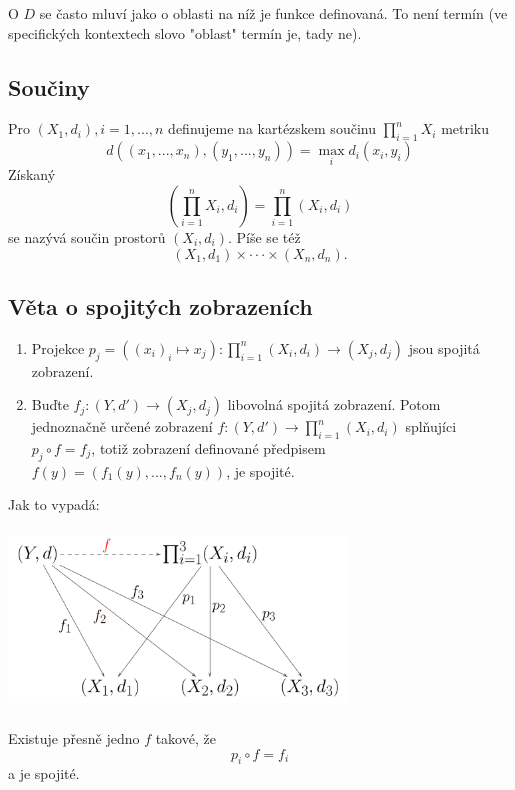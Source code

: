 \documentclass[../main.tex]{subfiles}
\begin{document}
O $D$ se často mluví jako o oblasti na níž je funkce definovaná. To není termín (ve specifických kontextech slovo "oblast" termín 
je, tady ne).

\subsection{Součiny}
\hspace{1.2mm}
Pro $(X_1,d_i), i = 1,...,n$ definujeme na kartézskem součinu $\prod^n_{i=1}X_i$ metriku
\[d((x_1,...,x_n),(y_1,...,y_n)) = \max_i d_i(x_i,y_i)\]
Získaný
\[\left(\prod^n_{i=1}X_i,d_i\right) = \prod^n_{i=1}(X_i,d_i)\]
se nazývá součin prostorů $(X_i, d_i)$. Píše se též 
\[(X_1,d_1) \times \cdot \cdot \cdot \times (X_n,d_n).\]

\subsection{Věta o spojitých zobrazeních}
\begin{enumerate}
\item Projekce $p_j = ((x_i)_i \mapsto x_j) : \prod^n_{i=1}(X_i,d_i) \rightarrow (X_j,d_j)$ jsou spojitá zobrazení.

\item Buďte $f_j:(Y,d') \rightarrow (X_j,d_j)$ libovolná spojitá zobrazení. Potom jednoznačně určené zobrazení 
$f:(Y,d') \rightarrow \prod^n_{i=1}(X_i,d_i)$ splňujíci $p_j \circ f = f_j$, totiž zobrazení definované předpisem
$f(y) = (f_1(y),...,f_n(y))$, je spojité.
\end{enumerate}
Jak to vypadá:
\begin{center}
\includegraphics[width=9cm,height=4.8cm]{ipkm.png}
\end{center}
Existuje přesně jedno $f$ takové, že 
\[p_i \circ f = f_i\]
a je spojité.
\end{document}
